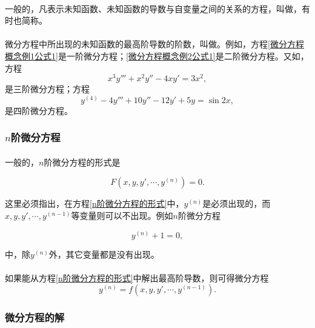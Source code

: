 \paragraph{}
一般的，凡表示未知函数、未知函数的导数与自变量之间的关系的方程，叫做，有时也简称。

\paragraph{}
微分方程中所出现的未知函数的最高阶导数的阶数，叫做。例如，方程\eqref{微分方程概念例1公式1}是一阶微分方程；\eqref{微分方程概念例2公式1}是二阶微分方程。又如，方程
\begin{equation}
x^3y''' + x^2y'' - 4xy' = 3x^2,
\end{equation}
是三阶微分方程；方程
\begin{equation}
y^{(4)} - 4y''' + 10y'' - 12y' + 5y = \sin{2x},
\end{equation}
是四阶微分方程。

\subsubsection{$n$阶微分方程}
\paragraph{}
一般的，$n$阶微分方程的形式是

\begin{equation}
\label{n阶微分方程的形式}
F(x,y,y',\cdots,y^{(n)})=0.
\end{equation}

这里必须指出，在方程\eqref{n阶微分方程的形式}中，$y^{(n)}$是必须出现的，而$x,y,y',\cdots,y^{(n-1)}$等变量则可以不出现。例如$n$阶微分方程

\begin{equation}
y^{(n)} + 1 = 0,
\end{equation}

中，除$y^{(n)}$外，其它变量都是没有出现。

\paragraph{}
如果能从方程\eqref{n阶微分方程的形式}中解出最高阶导数，则可得微分方程
\begin{equation}
  y^{(n)} = f(x,y,y',\cdots,y^{(n-1)}).
\end{equation}

\subsubsection{微分方程的解}
